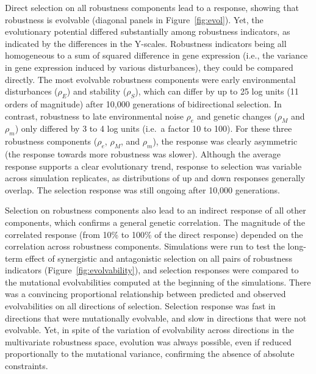 \documentclass[10pt,a4paper]{article}
\newcommand{\stability}{{\rho_S}}
\newcommand{\earlyenv}{{\rho_E}}
\newcommand{\lateenv}{{\rho_e}}
\newcommand{\earlymut}{{\rho_M}}
\newcommand{\latemut}{{\rho_m}}
\begin{document}
Direct selection on all robustness components lead to a response, showing that robustness is evolvable (diagonal panels in Figure~\ref{fig:evol}). Yet, the evolutionary potential differed substantially among robustness indicators, as indicated by the differences in the Y-scales. Robustness indicators being all homogeneous to a sum of squared difference in gene expression (i.e., the variance in gene expression induced by various disturbances), they could be compared directly. The most evolvable robustness components were early environmental disturbances ($\earlyenv$) and stability ($\stability$), which can differ by up to 25 log units (11 orders of magnitude) after 10,000 generations of bidirectional selection. In contrast, robustness to late environmental noise $\lateenv$ and genetic changes ($\earlymut$ and $\latemut$) only differed by 3 to 4 log units (i.e.\ a factor 10 to 100). For these three robustness components ($\lateenv$, $\earlymut$, and $\latemut$), the response was clearly asymmetric (the response towards more robustness was slower). Although the average response supports a clear evolutionary trend, response to selection was variable across simulation replicates, as distributions of up and down responses generally overlap. The selection response was still ongoing after 10,000 generations. 

Selection on robustness components also lead to an indirect response of all other components, which confirms a general genetic correlation. The magnitude of the correlated response (from 10\% to 100\% of the direct response) depended on the correlation across robustness components. Simulations were run to test the long-term effect of synergistic and antagonistic selection on all pairs of robustness indicators (Figure~\ref{fig:evolvability}), and selection responses were compared to the mutational evolvabilities computed at the beginning of the simulations. There was a convincing proportional relationship between predicted and observed evolvabilities on all directions of selection. Selection response was fast in directions that were mutationally evolvable, and slow in directions that were not evolvable. Yet, in spite of the variation of evolvability across directions in the multivariate robustness space, evolution was always possible, even if reduced proportionally to the mutational variance, confirming the absence of absolute constraints. 
\end{document}
